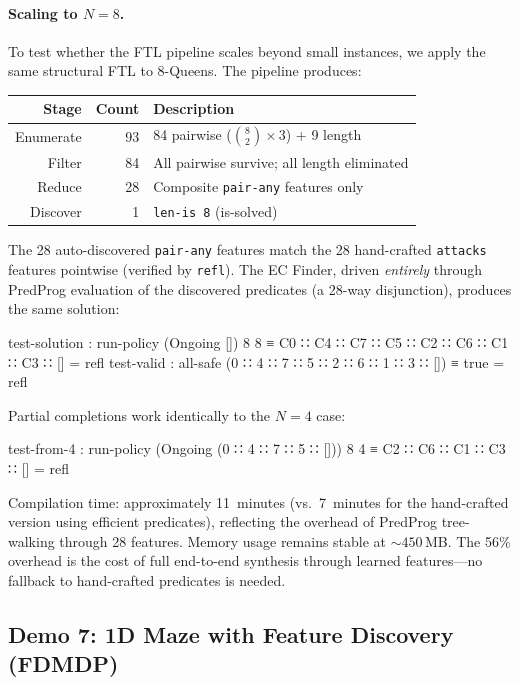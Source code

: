 \paragraph{Scaling to $N{=}8$.}
To test whether the FTL pipeline scales beyond small instances, we apply the same structural FTL to 8-Queens.  The pipeline produces:

\begin{center}
\small
\begin{tabular}{@{}rrl@{}}
\textbf{Stage} & \textbf{Count} & \textbf{Description} \\
\hline
Enumerate & 93 & 84 pairwise ($\binom{8}{2}\times 3$) + 9 length \\
Filter & 84 & All pairwise survive; all length eliminated \\
Reduce & 28 & Composite \texttt{pair-any} features only \\
Discover & 1 & \texttt{len-is~8} (is-solved)
\end{tabular}
\end{center}

\noindent The 28 auto-discovered \texttt{pair-any} features match the 28 hand-crafted \texttt{attacks} features pointwise (verified by \texttt{refl}).  The EC Finder, driven \emph{entirely} through PredProg evaluation of the discovered predicates (a 28-way disjunction), produces the same solution:

\begin{spec}
test-solution : run-policy (Ongoing []) 8 8
  ≡ C0 ∷ C4 ∷ C7 ∷ C5 ∷ C2 ∷ C6 ∷ C1 ∷ C3 ∷ []    = refl
test-valid : all-safe (0 ∷ 4 ∷ 7 ∷ 5 ∷ 2 ∷ 6 ∷ 1 ∷ 3 ∷ []) ≡ true  = refl
\end{spec}

\noindent Partial completions work identically to the $N{=}4$ case:
\begin{spec}
test-from-4 : run-policy (Ongoing (0 ∷ 4 ∷ 7 ∷ 5 ∷ [])) 8 4
  ≡ C2 ∷ C6 ∷ C1 ∷ C3 ∷ []                            = refl
\end{spec}

\noindent Compilation time: approximately 11~minutes (vs.\ 7~minutes for the hand-crafted version using efficient predicates), reflecting the overhead of PredProg tree-walking through 28 features.  Memory usage remains stable at ${\sim}450$\,MB.  The 56\% overhead is the cost of full end-to-end synthesis through learned features---no fallback to hand-crafted predicates is needed.


\subsection{Demo 7: 1D Maze with Feature Discovery (FDMDP)}
\label{sec:e2e-maze-auto}

